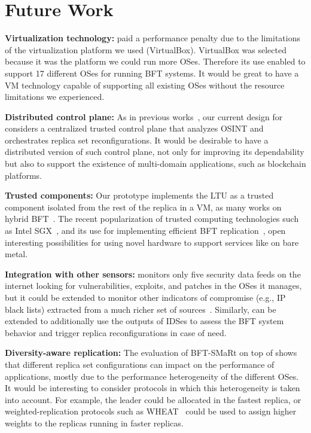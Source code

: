 \section{Future Work}

\textbf{Virtualization technology:}
\system paid a performance penalty due to the limitations of the virtualization platform we used (VirtualBox).
VirtualBox was selected because it was the platform we could run more OSes.
Therefore its use enabled \system to support 17 different OSes for running BFT systems.
It would be great to have a VM technology capable of supporting all existing OSes without the resource limitations we experienced.

\textbf{Distributed control plane:}
As in previous works~\cite{Roeder:2010,Platania:2014}, our current design for \system considers a centralized trusted control plane that analyzes OSINT and orchestrates replica set reconfigurations.
It would be desirable to have a distributed version of such control plane, not only for improving its dependability but also to support the existence of multi-domain applications, such as blockchain platforms.

\textbf{Trusted components:}
Our prototype implements the LTU as a trusted component isolated from the rest of the replica in a VM, as many works on hybrid BFT~\cite{Veronese:2013,Roeder:2010,Platania:2014,Sousa:2010,Distler:2011}.
The recent popularization of trusted computing technologies such as Intel SGX~\cite{sgx}, and its use for implementing efficient BFT replication~\cite{Behl:2017}, open interesting possibilities for using novel hardware to support services like \system on bare metal.

\textbf{Integration with other sensors:}
\system monitors only five security data feeds on the internet looking for vulnerabilities, exploits, and patches in the OSes it manages, but it could be extended to monitor other indicators of compromise (e.g., IP black lists) extracted from a much richer set of sources~\cite{Liao:2016,Sabottke:2015}.
Similarly, \system can be extended to additionally use the outputs of IDSes to assess the BFT system behavior and trigger replica reconfigurations in case of need.

\textbf{Diversity-aware replication:}
The evaluation of BFT-SMaRt on top of \system shows that different replica set configurations can impact on the performance of applications, mostly due to the performance heterogeneity of the different OSes.
It would be interesting to consider protocols in which this heterogeneity is taken into account.
For example, the leader could be allocated in the fastest replica, or weighted-replication protocols such as WHEAT~\cite{Sousa:2015} could be used to assign higher weights to the replicas running in faster replicas.

